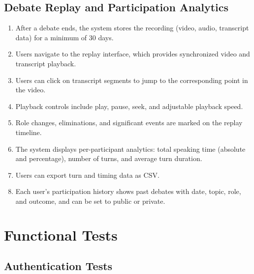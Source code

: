 \documentclass[12pt]{article}
\begin{document}
\subsection{Debate Replay and Participation Analytics}

\begin{enumerate}
    \item After a debate ends, the system stores the recording (video, audio, transcript data) for a minimum of 30 days.
    \item Users navigate to the replay interface, which provides synchronized video and transcript playback.
    \item Users can click on transcript segments to jump to the corresponding point in the video.
    \item Playback controls include play, pause, seek, and adjustable playback speed.
    \item Role changes, eliminations, and significant events are marked on the replay timeline.
    \item The system displays per-participant analytics: total speaking time (absolute and percentage), number of turns, and average turn duration.
    \item Users can export turn and timing data as CSV.
    \item Each user's participation history shows past debates with date, topic, role, and outcome, and can be set to public or private.
\end{enumerate}

\newpage

\section{Functional Tests}

\subsection{Authentication Tests}
\end{document}
